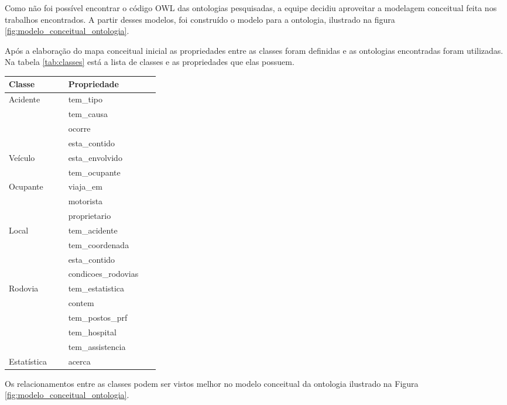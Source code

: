       Como não foi possível encontrar o código OWL das ontologias pesquisadas, a equipe decidiu aproveitar a
      modelagem conceitual feita nos trabalhos encontrados. A partir desses modelos, foi construído o modelo 
      para a ontologia, ilustrado na figura \ref{fig:modelo_conceitual_ontologia}.
      
      Após a elaboração do mapa conceitual inicial as propriedades entre as classes foram definidas e as ontologias encontradas foram utilizadas. 
      Na tabela \ref{tab:classes} está a lista de classes
      e as propriedades que elas possuem.      

      \begin{table*}[!h]
      \centering
      \begin{tabular}{p{0.15\linewidth}p{0.15\linewidth}}
	\hline
	\textbf{Classe} & \textbf{Propriedade} \\
	\hline
	  Acidente & tem\_tipo\\
	    & tem\_causa\\
	    & ocorre\\
	    & esta\_contido\\
	\hline
	  Veículo & esta\_envolvido\\
	    & tem\_ocupante\\
	\hline
	  Ocupante & viaja\_em\\
	    & motorista\\
	    & proprietario\\
	\hline
	  Local & tem\_acidente\\
	    & tem\_coordenada\\
	    & esta\_contido\\
	    & condicoes\_rodovias\\
	\hline
	  Rodovia & tem\_estatistica\\
	    & contem\\
	    & tem\_postos\_prf\\
	    & tem\_hospital\\
	    & tem\_assistencia\\
	\hline
	  Estatística & acerca\\
	\hline
      \end{tabular}
      \caption{Classes e Propriedades}
      \label{tab:classes}
      \end{table*}
      
      Os relacionamentos entre as classes podem ser vistos melhor no modelo conceitual da ontologia ilustrado na
      Figura \ref{fig:modelo_conceitual_ontologia}.\\
      
